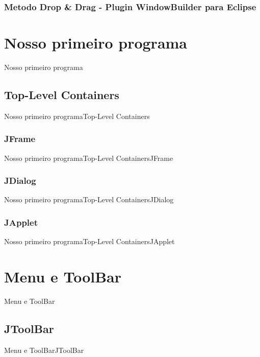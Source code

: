 \documentclass[10pt]{beamer}
\begin{document}
\subsubsection{Metodo Drop \& Drag - Plugin WindowBuilder para Eclipse}
\begin{frame}
\end{frame}{}
			
\section{Nosso primeiro programa}
\begin{frame}{Nosso primeiro programa}{}
\end{frame}{}
\subsection{Top-Level Containers}
\begin{frame}{Nosso primeiro programa}{Top-Level Containers}
\end{frame}{}
\subsubsection{JFrame}
\begin{frame}{Nosso primeiro programa}{Top-Level Containers}{JFrame}
\end{frame}{}
\subsubsection{JDialog}
\begin{frame}{Nosso primeiro programa}{Top-Level Containers}{JDialog}
\end{frame}{}
\subsubsection{JApplet}
\begin{frame}{Nosso primeiro programa}{Top-Level Containers}{JApplet}
\end{frame}{}
\section{Menu e ToolBar}
\begin{frame}{Menu e ToolBar}{}
\end{frame}{}
\subsection{JToolBar}
\begin{frame}{Menu e ToolBar}{JToolBar}
\end{frame}{}
\end{document}
